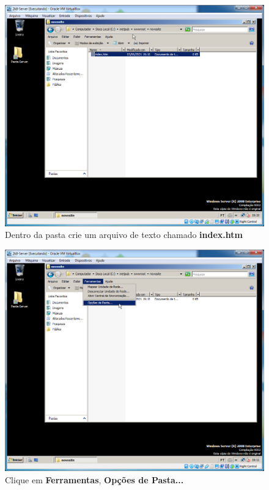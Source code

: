 \documentclass[10pt]{article}
\begin{document}
\begin{figure}[H]
    \centering
    \caption{Dentro da pasta crie um arquivo de texto chamado \textbf{index.htm}}
    \label{fig:5532028}
    \includegraphics[width=\linewidth]{images/IIS/criando_um_novo_site/028.png}
\end{figure}
\begin{figure}[H]
    \centering
    \caption{Clique em \textbf{Ferramentas}, \textbf{Opções de Pasta...}}
    \label{fig:5532029}
    \includegraphics[width=\linewidth]{images/IIS/criando_um_novo_site/029.png}
\end{figure}
\end{document}
